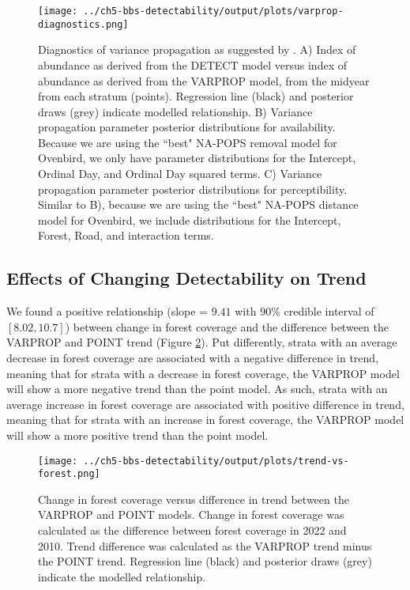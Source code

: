 \begin{figure}[h]
	\texttt{[image: ../ch5-bbs-detectability/output/plots/varprop-diagnostics.png]}
	\caption{Diagnostics of variance propagation as suggested by \citet{bravington_variance_2021}. A) Index of abundance as derived from the DETECT model versus index of abundance as derived from the VARPROP model, from the midyear from each stratum (points). Regression line (black) and posterior draws (grey) indicate modelled relationship. B) Variance propagation parameter posterior distributions for availability. Because we are using the ``best" NA-POPS removal model for Ovenbird, we only have parameter distributions for the Intercept, Ordinal Day, and Ordinal Day squared terms. C) Variance propagation parameter posterior distributions for perceptibility. Similar to B), because we are using the ``best" NA-POPS distance model for Ovenbird, we include distributions for the Intercept, Forest, Road, and interaction terms.}
	\label{fig:varprop-diagnostics}
\end{figure}

\subsection{Effects of Changing Detectability on Trend}
\par We found a positive relationship (slope = $9.41$ with 90\% credible interval of $[8.02, 10.7]$) between change in forest coverage and the difference between the VARPROP and POINT trend (Figure \ref{fig:trend-vs-forest}).
Put differently, strata with an average decrease in forest coverage are associated with a negative difference in trend, meaning that for strata with a decrease in forest coverage, the VARPROP model will show a more negative trend than the point model.
As such, strata with an average increase in forest coverage are associated with positive difference in trend, meaning that for strata with an increase in forest coverage, the VARPROP model will show a more positive trend than the point model.

\begin{figure}[h]
	\texttt{[image: ../ch5-bbs-detectability/output/plots/trend-vs-forest.png]}
	\caption{Change in forest coverage versus difference in trend between the VARPROP and POINT models. Change in forest coverage was calculated as the difference between forest coverage in 2022 and 2010. Trend difference was calculated as the VARPROP trend minus the POINT trend. Regression line (black) and posterior draws (grey) indicate the modelled relationship.}
	\label{fig:trend-vs-forest}
\end{figure}

